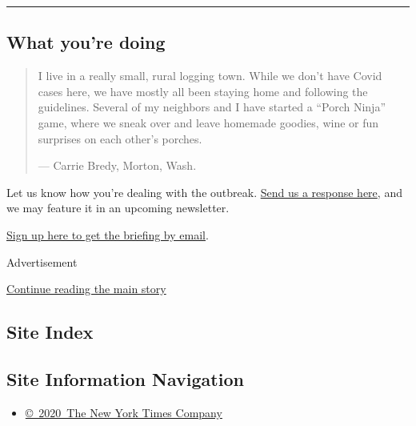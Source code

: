 \begin{center}\rule{0.5\linewidth}{\linethickness}\end{center}

\hypertarget{what-youre-doing}{%
\subsection{What you're doing}\label{what-youre-doing}}

\begin{quote}
I live in a really small, rural logging town. While we don't have Covid
cases here, we have mostly all been staying home and following the
guidelines. Several of my neighbors and I have started a ``Porch Ninja''
game, where we sneak over and leave homemade goodies, wine or fun
surprises on each other's porches.

--- Carrie Bredy, Morton, Wash.
\end{quote}

Let us know how you're dealing with the outbreak.
\href{https://www.nytimes.com/2020/03/02/reader-center/coronavirus-preparation.html}{Send
us a response here}, and we may feature it in an upcoming newsletter.

\href{https://www.nytimes.com/newsletters/coronavirus-briefing}{Sign up
here to get the briefing by email}.

Advertisement

\protect\hyperlink{after-bottom}{Continue reading the main story}

\hypertarget{site-index}{%
\subsection{Site Index}\label{site-index}}

\hypertarget{site-information-navigation}{%
\subsection{Site Information
Navigation}\label{site-information-navigation}}

\begin{itemize}
\tightlist
\item
  \href{https://help.nytimes.com/hc/en-us/articles/115014792127-Copyright-notice}{©~2020~The
  New York Times Company}
\end{itemize}


